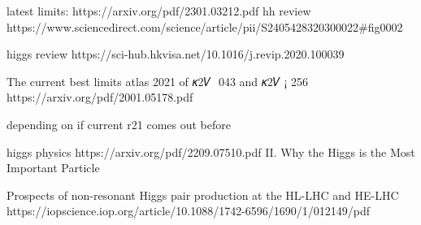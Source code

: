 latest limits: https://arxiv.org/pdf/2301.03212.pdf 
hh review 
https://www.sciencedirect.com/science/article/pii/S2405428320300022#fig0002

higgs review
https://sci-hub.hkvisa.net/10.1016/j.revip.2020.100039

The current best limits 
atlas 2021 
of 𝜅2𝑉  043 and 𝜅2𝑉 ¡ 256
https://arxiv.org/pdf/2001.05178.pdf 

depending on if current r21 comes out before
    

higgs physics
https://arxiv.org/pdf/2209.07510.pdf 
II. Why the Higgs is the Most Important Particle



Prospects of non-resonant Higgs pair production
at the HL-LHC and HE-LHC
https://iopscience.iop.org/article/10.1088/1742-6596/1690/1/012149/pdf


